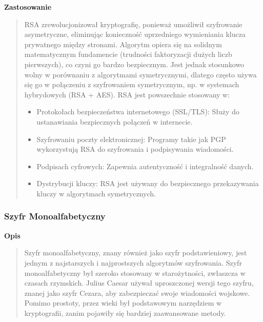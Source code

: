 \documentclass[12pt,a4paper]{article}
\begin{document}
\noindent\textbf{Zastosowanie}
\begin{quotation}\noindent RSA zrewolucjonizował kryptografię, ponieważ umożliwił szyfrowanie asymetryczne, eliminując konieczność uprzedniego wymieniania klucza prywatnego między stronami. Algorytm opiera się na solidnym matematycznym fundamencie (trudności faktoryzacji dużych liczb pierwszych), co czyni go bardzo bezpiecznym. Jest jednak stosunkowo wolny w porównaniu z algorytmami symetrycznymi, dlatego często używa się go w połączeniu z szyfrowaniem symetrycznym, np. w systemach hybrydowych (RSA + AES). RSA jest powszechnie stosowany w:
\begin{itemize}
\item Protokołach bezpieczeństwa internetowego (SSL/TLS): Służy do ustanawiania bezpiecznych połączeń w internecie.
\item Szyfrowaniu poczty elektronicznej: Programy takie jak PGP wykorzystują RSA do szyfrowania i podpisywania wiadomości.
\item Podpisach cyfrowych: Zapewnia autentyczność i integralność danych.
\item Dystrybucji kluczy: RSA jest używany do bezpiecznego przekazywania kluczy w algorytmach symetrycznych.
\end{itemize}
\end{quotation}



\subsubsection{Szyfr Monoalfabetyczny}
\noindent\textbf{Opis}
\begin{quotation}\noindent Szyfr monoalfabetyczny, znany również jako szyfr podstawieniowy, jest jednym z najstarszych i najprostszych algorytmów szyfrowania. Szyfr monoalfabetyczny był szeroko stosowany w starożytności, zwłaszcza w czasach rzymskich. Julius Caesar używał uproszczonej wersji tego szyfru, znanej jako szyfr Cezara, aby zabezpieczać swoje wiadomości wojskowe. Pomimo prostoty, przez wieki był podstawowym narzędziem w kryptografii, zanim pojawiły się bardziej zaawansowane metody.
\end{quotation}
\end{document}
